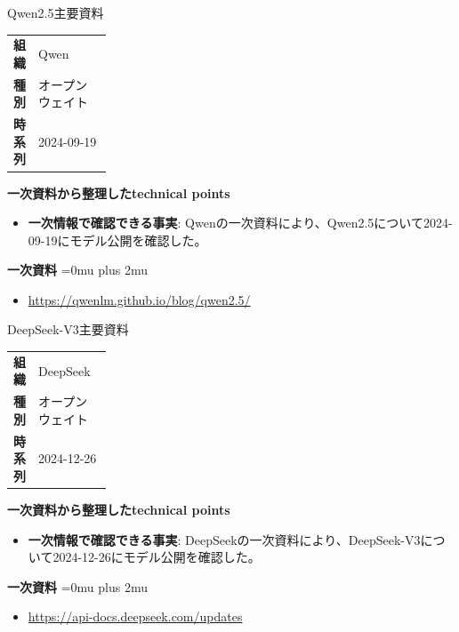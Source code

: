 \begin{technicalnote}{Qwen2.5}{主要資料}
\begingroup
\begin{tabularx}{\linewidth}{@{}>{\bfseries}p{0.22\linewidth}X@{}}
組織 & Qwen \\
種別 & オープンウェイト \\
時系列 & 2024-09-19 \\
\end{tabularx}
\smallskip
{\bfseries 一次資料から整理したtechnical points}
\begin{itemize}[leftmargin=1.5em,itemsep=0.35em]
\item \textbf{一次情報で確認できる事実}: Qwenの一次資料により、Qwen2.5について2024-09-19にモデル公開を確認した。
\end{itemize}
\begin{minipage}{\linewidth}
\begin{samepage}
{\bfseries 一次資料}
\begingroup\sloppy
\Urlmuskip=0mu plus 2mu\relax
\begin{itemize}[leftmargin=1.5em,itemsep=0.25em]
\item {\scriptsize\url{https://qwenlm.github.io/blog/qwen2.5/}}
\end{itemize}
\endgroup
\end{samepage}
\end{minipage}
\endgroup
\end{technicalnote}
\medskip

\begin{technicalnote}{DeepSeek-V3}{主要資料}
\begingroup
\begin{tabularx}{\linewidth}{@{}>{\bfseries}p{0.22\linewidth}X@{}}
組織 & DeepSeek \\
種別 & オープンウェイト \\
時系列 & 2024-12-26 \\
\end{tabularx}
\smallskip
{\bfseries 一次資料から整理したtechnical points}
\begin{itemize}[leftmargin=1.5em,itemsep=0.35em]
\item \textbf{一次情報で確認できる事実}: DeepSeekの一次資料により、DeepSeek-V3について2024-12-26にモデル公開を確認した。
\end{itemize}
\begin{minipage}{\linewidth}
\begin{samepage}
{\bfseries 一次資料}
\begingroup\sloppy
\Urlmuskip=0mu plus 2mu\relax
\begin{itemize}[leftmargin=1.5em,itemsep=0.25em]
\item {\scriptsize\url{https://api-docs.deepseek.com/updates}}
\end{itemize}
\endgroup
\end{samepage}
\end{minipage}
\endgroup
\end{technicalnote}
\medskip


